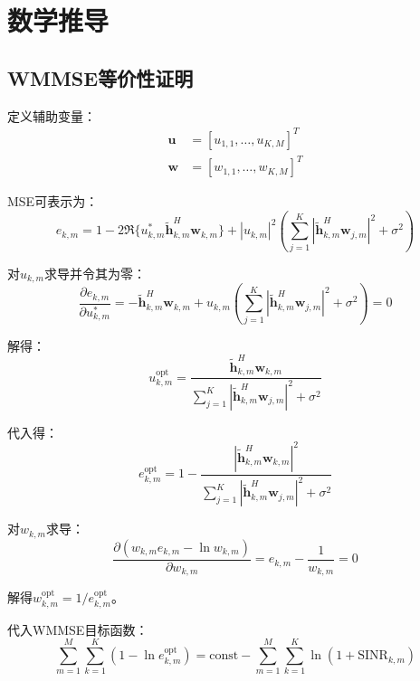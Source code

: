 \documentclass[10pt,twocolumn]{IEEEtran}
\newcommand{\vect}[1]{\mathbf{#1}}
\begin{document}
\appendix

\section{数学推导}

\subsection{WMMSE等价性证明}

定义辅助变量：
\begin{align}
\vect{u} &= [u_{1,1}, \ldots, u_{K,M}]^T \\
\vect{w} &= [w_{1,1}, \ldots, w_{K,M}]^T
\end{align}

MSE可表示为：
\begin{equation}
e_{k,m} = 1 - 2\Re\{u_{k,m}^* \tilde{\vect{h}}_{k,m}^H \vect{w}_{k,m}\} + |u_{k,m}|^2 \left(\sum_{j=1}^K |\tilde{\vect{h}}_{k,m}^H \vect{w}_{j,m}|^2 + \sigma^2\right)
\end{equation}

对$u_{k,m}$求导并令其为零：
\begin{equation}
\frac{\partial e_{k,m}}{\partial u_{k,m}^*} = -\tilde{\vect{h}}_{k,m}^H \vect{w}_{k,m} + u_{k,m} \left(\sum_{j=1}^K |\tilde{\vect{h}}_{k,m}^H \vect{w}_{j,m}|^2 + \sigma^2\right) = 0
\end{equation}

解得：
\begin{equation}
u_{k,m}^{\text{opt}} = \frac{\tilde{\vect{h}}_{k,m}^H \vect{w}_{k,m}}{\sum_{j=1}^K |\tilde{\vect{h}}_{k,m}^H \vect{w}_{j,m}|^2 + \sigma^2}
\end{equation}

代入得：
\begin{equation}
e_{k,m}^{\text{opt}} = 1 - \frac{|\tilde{\vect{h}}_{k,m}^H \vect{w}_{k,m}|^2}{\sum_{j=1}^K |\tilde{\vect{h}}_{k,m}^H \vect{w}_{j,m}|^2 + \sigma^2}
\end{equation}

对$w_{k,m}$求导：
\begin{equation}
\frac{\partial (w_{k,m} e_{k,m} - \ln w_{k,m})}{\partial w_{k,m}} = e_{k,m} - \frac{1}{w_{k,m}} = 0
\end{equation}

解得$w_{k,m}^{\text{opt}} = 1/e_{k,m}^{\text{opt}}$。

代入WMMSE目标函数：
\begin{equation}
\sum_{m=1}^M \sum_{k=1}^K (1 - \ln e_{k,m}^{\text{opt}}) = \text{const} - \sum_{m=1}^M \sum_{k=1}^K \ln\left(1 + \text{SINR}_{k,m}\right)
\end{equation}
\end{document}
